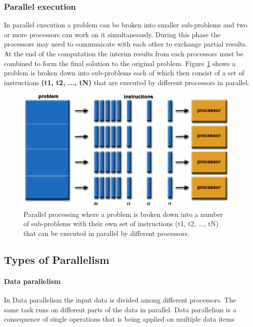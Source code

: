 \subsubsection{Parallel execution}
In parallel execution a problem can be broken into smaller sub-problems and two or more processors can work on it simultaneously. During this phase the processors may need to communicate with each other to exchange partial results. At the end of the computation the interim results from each processors must be combined to form the final solution to the original problem. Figure \ref{fig:parallel-processing} shows a problem is broken down into sub-problems each of which then consist of a set of instructions \textbf{(t1, t2, ..., tN)} that are executed by different processors in parallel.

\begin{figure}[!htb]
  \center
  \includegraphics[width=\linewidth]{figs/parallelProblem.png}
  \caption{Parallel processing where a problem is broken down into a number of sub-problems with their own set of instructions (t1, t2, ..., tN) that can be executed in parallel by different processors. \citep{Barney:16}}
  \label{fig:parallel-processing}
  \center
\end{figure}

\subsection{Types of Parallelism}

\paragraph{Data parallelism}
In Data parallelism the input data is divided among different processors. The same task runs on different parts of the data in parallel. Data parallelism is a consequence of single operations that is being applied on multiple data items

